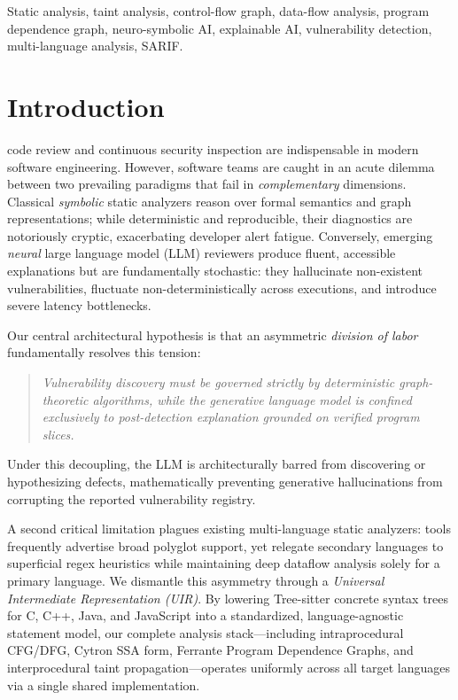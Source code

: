 \documentclass[10pt,conference]{IEEEtran}
\begin{document}
\begin{IEEEkeywords}
Static analysis, taint analysis, control-flow graph, data-flow analysis,
program dependence graph, neuro-symbolic AI, explainable AI, vulnerability
detection, multi-language analysis, SARIF.
\end{IEEEkeywords}

\section{Introduction}
 code review and continuous security inspection are indispensable in modern software engineering. However, software teams are caught in an acute dilemma between two prevailing paradigms that fail in \emph{complementary} dimensions. Classical \emph{symbolic} static analyzers reason over formal semantics and graph representations; while deterministic and reproducible, their diagnostics are notoriously cryptic, exacerbating developer alert fatigue. Conversely, emerging \emph{neural} large language model (LLM) reviewers produce fluent, accessible explanations but are fundamentally stochastic: they hallucinate non-existent vulnerabilities, fluctuate non-deterministically across executions, and introduce severe latency bottlenecks.

Our central architectural hypothesis is that an asymmetric \emph{division of labor} fundamentally resolves this tension:
\begin{quote}
\emph{Vulnerability discovery must be governed strictly by deterministic graph-theoretic algorithms, while the generative language model is confined exclusively to post-detection explanation grounded on verified program slices.}
\end{quote}
Under this decoupling, the LLM is architecturally barred from discovering or hypothesizing defects, mathematically preventing generative hallucinations from corrupting the reported vulnerability registry.

A second critical limitation plagues existing multi-language static analyzers: tools frequently advertise broad polyglot support, yet relegate secondary languages to superficial regex heuristics while maintaining deep dataflow analysis solely for a primary language. We dismantle this asymmetry through a \emph{Universal Intermediate Representation (UIR)}. By lowering Tree-sitter concrete syntax trees for C, C++, Java, and JavaScript into a standardized, language-agnostic statement model, our complete analysis stack---including intraprocedural CFG/DFG, Cytron SSA form, Ferrante Program Dependence Graphs, and interprocedural taint propagation---operates uniformly across all target languages via a single shared implementation.
\end{document}

